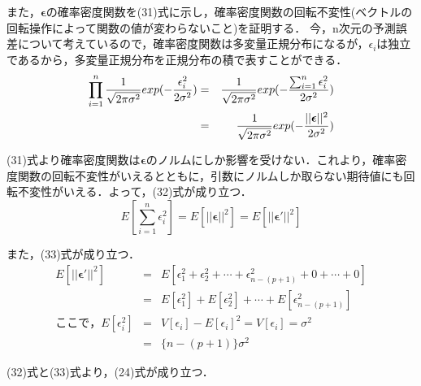 \documentclass[dvipdfmx]{jsarticle}
\begin{document}
また，$\boldsymbol{\epsilon}$の確率密度関数を(31)式に示し，確率密度関数の回転不変性(ベクトルの回転操作によって関数の値が変わらないこと)を証明する．
今，n次元の予測誤差について考えているので，確率密度関数は多変量正規分布になるが，$\epsilon_i$は独立であるから，多変量正規分布を正規分布の積で表すことができる．
\begin{eqnarray}
  \prod_{i=1}^n \frac{1}{\sqrt{2\pi\sigma^2}}exp(-\frac{\epsilon_i^2}{2\sigma^2})
  \displaystyle
  &=&\frac{1}{\sqrt{2\pi\sigma^2}}exp(-\frac{\sum_{i=1}^n\epsilon_i^2}{2\sigma^2}) \nonumber \\
  &=&\frac{1}{\sqrt{2\pi\sigma^2}}exp(-\frac{||\boldsymbol{\epsilon}||^2}{2\sigma^2})
\end{eqnarray}

(31)式より確率密度関数は$\boldsymbol{\epsilon}$のノルムにしか影響を受けない．これより，確率密度関数の回転不変性がいえるとともに，引数にノルムしか取らない期待値にも回転不変性がいえる．よって，(32)式が成り立つ．
\begin{equation}
  E\left[\sum_{i=1}^n\epsilon_i^2\right]=E[||\boldsymbol{\epsilon}||^2]=E[||\boldsymbol{\epsilon}'||^2]
\end{equation}

また，(33)式が成り立つ．
\begin{eqnarray}
  E[||\boldsymbol{\epsilon}'||^2]&=&E[\epsilon_1^2+\epsilon_2^2+\cdots+\epsilon_{n-(p+1)}^2+0+\cdots+0] \nonumber \\
  &=&E[\epsilon_1^2]+E[\epsilon_2^2]+\cdots+E[\epsilon_{n-(p+1)}^2] \nonumber \\
  ここで，E[\epsilon_i^2]&=&V[\epsilon_i]-E[\epsilon_i]^2=V[\epsilon_i]=\sigma^2 \nonumber \\
  &=&\{n-(p+1)\} \sigma^2
\end{eqnarray}

(32)式と(33)式より，(24)式が成り立つ．
\end{document}
